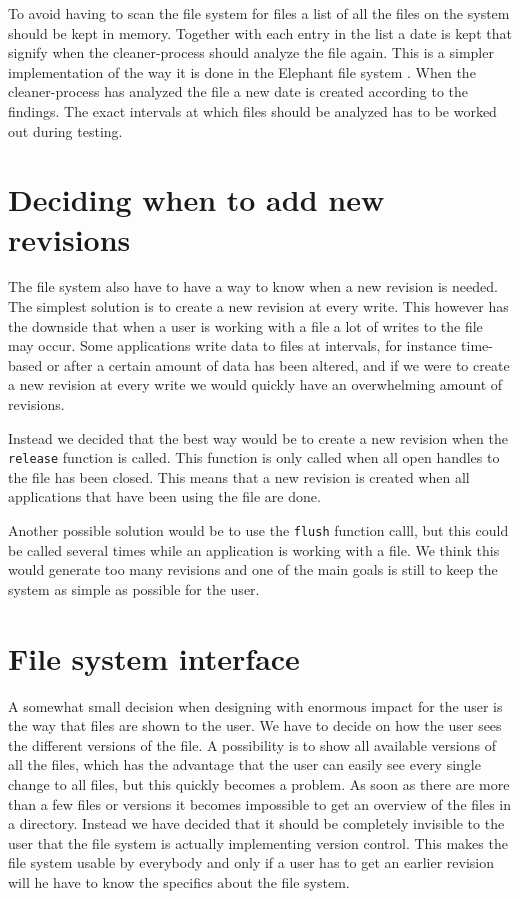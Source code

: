 \documentclass[12pt]{article}
\begin{document}
To avoid having to scan the file system for files a list of all the
files on the system should be kept in memory. Together with each entry
in the list a date is kept that signify when the cleaner-process
should analyze the file again. This is a simpler implementation of the
way it is done in the Elephant file system \cite{Santry:1999gf}. When
the cleaner-process has analyzed the file a new date is created
according to the findings. The exact intervals at which files should
be analyzed has to be worked out during testing.

\section{Deciding when to add new revisions}
The file system also have to have a way to know when a new revision is
needed. The simplest solution is to create a new revision at every 
write. This however has the downside that when a user is working with
a file a lot of writes to the file may occur. Some applications write 
data to files at intervals, for instance time-based or after a certain 
amount of data has been altered, and if we were to create a new 
revision at every write we would quickly have an overwhelming amount 
of revisions.

Instead we decided that the best way would be to create a new revision
when the \texttt{release} function is called. This function is only
called when all open handles to the file has been closed. This means
that a new revision is created when all applications that have been
using the file are done.

Another possible solution would be to use the \texttt{flush} function
calll, but this could be called several times while an application is
working with a file. We think this would generate too many revisions
and one of the main goals is still to keep the system as simple as 
possible for the user.

\section{File system interface}
A somewhat small decision when designing with enormous impact for the
user is the way that files are shown to the user.
We have to decide on how the user sees the different versions of the
file. A possibility is to show all available versions of all the
files,
which has the advantage that the user can easily see every single
change to all files, but this quickly becomes a problem.
As soon as there are more than a few files or versions it becomes
impossible to get an overview of the files in a directory.
Instead we have decided that it should be completely invisible to the
user that the file system is actually implementing version control.
This makes the file system usable by everybody and only if a user has
to get an earlier revision will he have to know the specifics about
the file system.
\end{document}
